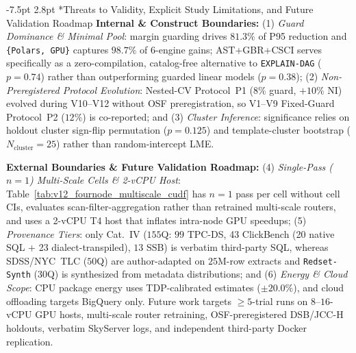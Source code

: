 \documentclass[10pt,a4paper]{article}
\makeatletter
\renewcommand\subsection{\@startsection{subsection}{2}{\z@}%
  {-7.5pt \@plus -2pt \@minus -1pt}%
  {2.8pt \@plus 1pt}%
  {\normalfont\normalsize\bfseries}}
\makeatother
\begin{document}
\subsection*{Threats to Validity, Explicit Study Limitations, and Future Validation Roadmap}
\noindent\textbf{Internal \& Construct Boundaries:} (1) \emph{Guard Dominance \& Minimal Pool}: margin guarding drives $81.3\%$ of P95 reduction and \texttt{\{Polars, GPU\}} captures $98.7\%$ of 6-engine gains; AST+GBR+$\text{CSCI}$ serves specifically as a zero-compilation, catalog-free alternative to \texttt{EXPLAIN-DAG} ($p=0.74$) rather than outperforming guarded linear models ($p=0.38$); (2) \emph{Non-Preregistered Protocol Evolution}: Nested-CV Protocol~P1 ($8\%$ guard, $+10\%$ NI) evolved during V10--V12 without OSF preregistration, so V1--V9 Fixed-Guard Protocol~P2 ($12\%$) is co-reported; and (3) \emph{Cluster Inference}: significance relies on holdout cluster sign-flip permutation ($p = 0.125$) and template-cluster bootstrap ($N_{\text{cluster}}=25$) rather than random-intercept LME.

\noindent\textbf{External Boundaries \& Future Validation Roadmap:} (4) \emph{Single-Pass ($n=1$) Multi-Scale Cells \& 2-vCPU Host}: Table~\ref{tab:v12_fournode_multiscale_cudf} has $n=1$ pass per cell without cell CIs, evaluates scan-filter-aggregation rather than retrained multi-scale routers, and uses a 2-vCPU T4 host that inflates intra-node GPU speedups; (5) \emph{Provenance Tiers}: only Cat.~IV ($155$Q: $99$ TPC-DS, 43 ClickBench (20 native SQL + 23 dialect-transpiled), $13$ SSB) is verbatim third-party SQL, whereas SDSS/NYC~TLC ($50$Q) are author-adapted on $25\text{M}$-row extracts and \texttt{Redset-Synth} ($30$Q) is synthesized from metadata distributions; and (6) \emph{Energy \& Cloud Scope}: CPU package energy uses TDP-calibrated estimates ($\pm 20.0\%$), and cloud offloading targets BigQuery only. Future work targets $\ge 5$-trial runs on $8\text{--}16$-vCPU GPU hosts, multi-scale router retraining, OSF-preregistered DSB/JCC-H holdouts, verbatim SkyServer logs, and independent third-party Docker replication.




\end{document}
